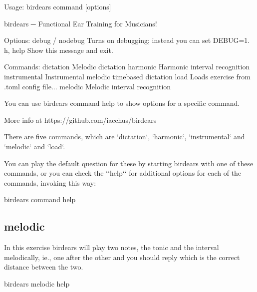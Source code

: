 \documentclass[letterpaper,10pt,english]{sphinxmanual}
\begin{document}
\begin{sphinxVerbatim}[commandchars=\\\{\}]
Usage: birdears  \PYGZlt{}command\PYGZgt{} [options]

  birdears ─ Functional Ear Training for Musicians!

Options:
  \PYGZhy{}\PYGZhy{}debug / \PYGZhy{}\PYGZhy{}no\PYGZhy{}debug  Turns on debugging; instead you can set DEBUG=1.
  \PYGZhy{}h, \PYGZhy{}\PYGZhy{}help            Show this message and exit.

Commands:
  dictation     Melodic dictation
  harmonic      Harmonic interval recognition
  instrumental  Instrumental melodic time\PYGZhy{}based dictation
  load          Loads exercise from .toml config file...
  melodic       Melodic interval recognition

  You can use \PYGZsq{}birdears \PYGZlt{}command\PYGZgt{} \PYGZhy{}\PYGZhy{}help\PYGZsq{} to show options for a specific
  command.

  More info at https://github.com/iacchus/birdears


There are five commands, which are {}`dictation{}`, {}`harmonic{}`, {}`instrumental{}` and
{}`melodic{}` and {}`load{}`.

You can play the default question for these by starting birdears with one of
these commands, or you can check the {}`{}`\PYGZhy{}\PYGZhy{}help{}`{}` for additional options for each
of the commands, invoking this way:
\end{sphinxVerbatim}

\begin{sphinxVerbatim}[commandchars=\\\{\}]
birdears \PYGZlt{}command\PYGZgt{} \PYGZhy{}\PYGZhy{}help
\end{sphinxVerbatim}


\subsection{melodic}
\label{\detokenize{index:melodic}}
In this exercise birdears will play two notes, the tonic and the interval
melodically, ie., one after the other and you should reply which is the
correct distance between the two.

\begin{sphinxVerbatim}[commandchars=\\\{\}]
birdears melodic \PYGZhy{}\PYGZhy{}help
\end{sphinxVerbatim}
\end{document}
